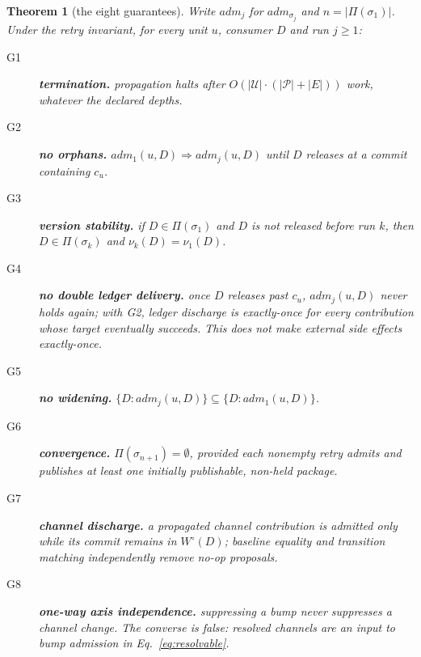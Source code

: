 \documentclass[10pt,conference]{IEEEtran}
\newtheorem{theorem}{Theorem}
\theoremstyle{definition}
\newcommand{\G}[1]{G#1}
\begin{document}
\begin{theorem}[the eight guarantees]
\label{thm:g}
Write $\mathit{adm}_j$ for $\mathit{adm}_{\sigma_j}$ and $n =
|\Pi(\sigma_1)|$. Under the retry invariant, for every unit $u$, consumer
$D$ and run $j \geq 1$:
\begin{description}
  \item[\G{1}] \textbf{termination.} propagation halts after $O(|\mathcal{U}|
    \cdot (|\mathcal{P}|{+}|E|))$ work, whatever the declared depths.
  \item[\G{2}] \textbf{no orphans.} $\mathit{adm}_1(u,D) \Rightarrow
    \mathit{adm}_j(u,D)$ until $D$ releases at a commit containing
    $c_u$.
  \item[\G{3}] \textbf{version stability.} if $D \in \Pi(\sigma_1)$ and $D$ is not
    released before run $k$, then $D \in \Pi(\sigma_k)$ and $\nu_k(D) =
    \nu_1(D)$.
  \item[\G{4}] \textbf{no double ledger delivery.} once $D$ releases past $c_u$,
    $\mathit{adm}_j(u,D)$ never holds again; with \G{2}, ledger discharge is
    exactly-once for every contribution whose target eventually succeeds.
    This does not make external side effects exactly-once.
  \item[\G{5}] \textbf{no widening.} $\{D : \mathit{adm}_j(u,D)\} \subseteq
    \{D : \mathit{adm}_1(u,D)\}$.
  \item[\G{6}] \textbf{convergence.} $\Pi(\sigma_{n+1}) = \emptyset$, provided
    each nonempty retry admits and publishes at least one initially
    publishable, non-held package.
  \item[\G{7}] \textbf{channel discharge.} a propagated channel contribution is
    admitted only while its commit remains in $W^\circ(D)$; baseline
    equality and transition matching independently remove no-op proposals.
  \item[\G{8}] \textbf{one-way axis independence.} suppressing a bump never
    suppresses a channel change. The converse is false: resolved channels
    are an input to bump admission in Eq.~\ref{eq:resolvable}.
\end{description}
\end{theorem}
\end{document}
